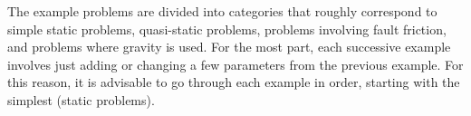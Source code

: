 The example problems are divided into categories that roughly correspond
to simple static problems, quasi-static problems, problems involving
fault friction, and problems where gravity is used. For the most part,
each successive example involves just adding or changing a few parameters
from the previous example. For this reason, it is advisable to go
through each example in order, starting with the simplest (static
problems).









